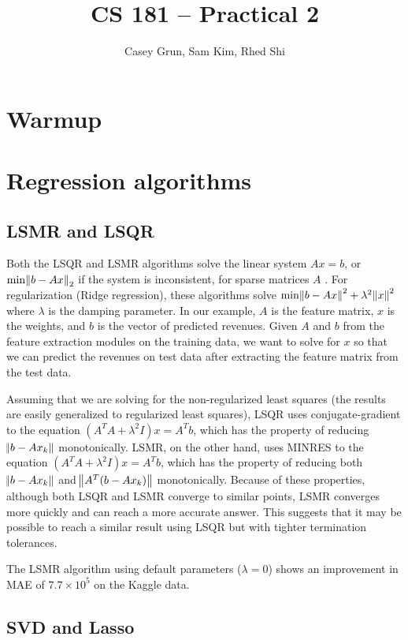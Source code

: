 \documentclass[11pt]{amsart}
\title{CS 181 -- Practical 2}
\author{Casey Grun, Sam Kim, Rhed Shi}
\begin{document}
\maketitle

\section{Warmup}

\section{Regression algorithms}

\subsection{LSMR and LSQR}

Both the LSQR and LSMR algorithms solve the linear system $Ax=b$, or $\text{min}\norm{b-Ax}_2$ if the system is inconsistent, for sparse matrices $A$ \cite{LSMR}. For regularization (Ridge regression), these algorithms solve $\text{min}\norm{b-Ax}^2+\lambda^2\norm{x}^2$ where $\lambda$ is the damping parameter. In our example, $A$ is the feature matrix, $x$ is the weights, and $b$ is the vector of predicted revenues. Given $A$ and $b$ from the feature extraction modules on the training data, we want to solve for $x$ so that we can predict the revenues on test data after extracting the feature matrix from the test data.

Assuming that we are solving for the non-regularized least squares (the results are easily generalized to regularized least squares), LSQR uses conjugate-gradient to the equation $(A^TA+\lambda^2I)x=A^Tb$, which has the property of reducing $\norm{b-Ax_k}$ monotonically. LSMR, on the other hand, uses MINRES to the equation $(A^TA+\lambda^2I)x=A^Tb$, which has the property of reducing both $\norm{b-Ax_k}$ and $\norm{A^T(b-Ax_k)}$ monotonically. Because of these properties, although both LSQR and LSMR converge to similar points, LSMR converges more quickly and can reach a more accurate answer. This suggests that it may be possible to reach a similar result using LSQR but with tighter termination tolerances.

The LSMR algorithm using default parameters ($\lambda=0$) shows an improvement in MAE of $7.7\times10^5$ on the Kaggle data.

\subsection{SVD and Lasso}
\end{document}
